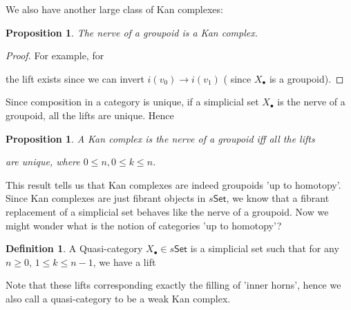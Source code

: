 \documentclass[11pt]{amsart}
\numberwithin{equation}{section}
\newtheorem{prop}[thm]{Proposition}
\theoremstyle{definition}
\newtheorem{defn}[thm]{Definition}
\theoremstyle{remark}
\numberwithin{equation}{section}
\newcommand{\CN}{{\mathcal N}}
\newcommand{\set}{\mathsf{Set}}
\begin{document}
We also have another large class of Kan complexes:
\begin{prop}
	The nerve of a groupoid is a Kan complex.
\end{prop}
\begin{proof}
	For example, for \begin{center}
	\end{center}
the lift exists since we can invert $i(v_0)\to i(v_1)$ ( since $X_{\bullet}$ is a groupoid). 
\end{proof}
Since composition in a category is unique, if a simplicial set $X_{\bullet}$ is the nerve of a groupoid, all the lifts are unique. Hence
\begin{prop}
	A Kan complex is the nerve of a groupoid iff all the lifts
		\begin{center}
	\end{center}
are unique, where $0\le n, 0\le k \le n$.
\end{prop}
This result tells us that Kan complexes are indeed groupoids 'up to homotopy'. Since Kan complexes are just fibrant objects in  $s\set$, we know that a fibrant replacement of a simplicial set behaves like the nerve of a groupoid. Now we might wonder what is the notion of categories 'up to homotopy'?

\begin{defn}
		A Quasi-category $X_{\bullet} \in s\set$ is a simplicial set such that for any $n\ge 0$, $1\le k \le n-1$, we have a lift
	\begin{center}
	\end{center}
Note that these lifts corresponding exactly the filling of 'inner horns', hence we also call a quasi-category to be a weak Kan complex.
\end{defn}
\end{document}

